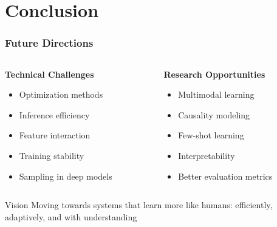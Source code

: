 \documentclass{beamer}
\begin{document}
\section{Conclusion}

\begin{frame}
\frametitle{Future Directions}
\begin{columns}[T]
    \begin{column}{0.48\textwidth}
        \textbf{Technical Challenges}
        \begin{itemize}
        \item Optimization methods
        \item Inference efficiency
        \item Feature interaction
        \item Training stability
        \item Sampling in deep models
        \end{itemize}
    \end{column}
    \begin{column}{0.48\textwidth}
        \textbf{Research Opportunities}
        \begin{itemize}
        \item Multimodal learning
        \item Causality modeling
        \item Few-shot learning
        \item Interpretability
        \item Better evaluation metrics
        \end{itemize}
    \end{column}
\end{columns}

\begin{alertblock}{Vision}
Moving towards systems that learn more like humans: efficiently, adaptively, and with understanding
\end{alertblock}
\end{frame}
\end{document}
